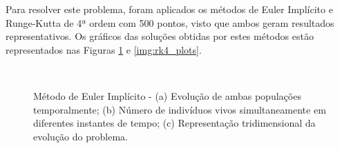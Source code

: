 Para resolver este problema, foram aplicados os métodos de Euler Implícito e Runge-Kutta de 4ª ordem com 500 pontos, visto que ambos geram resultados representativos. Os gráficos das soluções obtidas por estes métodos estão representados nas Figuras \ref{img:explicit_euler_plots} e \ref{img:rk4_plots}.
\begin{figure}[H]
	\centering
	\mbox{
	}
	\mbox{
	}
	\caption{Método de Euler Implícito - (a) Evolução de ambas populações temporalmente; (b) Número de indivíduos vivos simultaneamente em diferentes instantes de tempo; (c) Representação tridimensional da evolução do problema.}
    \label{img:explicit_euler_plots}
\end{figure}

